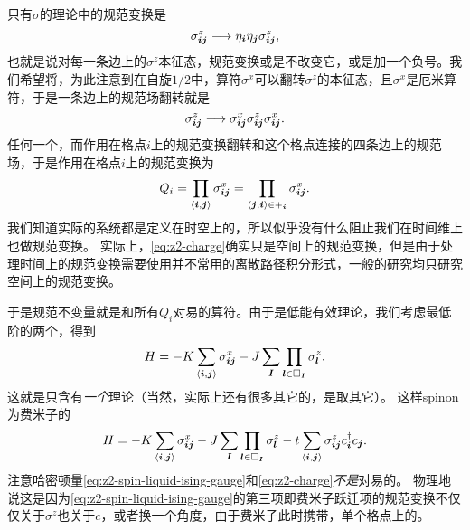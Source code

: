 只有$\sigma$的理论中的规范变换是
\begin{equation}
    {\sigma}_{\vb*{i} \vb*{j}}^z \longrightarrow \eta_{\vb*{i}} \eta_{\vb*{j}} {\sigma}_{\vb*{i} \vb*{j}}^z,
    \label{eq:pure-sigma-ztwo}
\end{equation}
也就是说对每一条边上的${\sigma}^z$本征态，规范变换或是不改变它，或是加一个负号。我们希望将，为此注意到在自旋$1/2$中，算符${\sigma}^x$可以翻转${\sigma}^z$的本征态，且${\sigma}^x$是厄米算符，于是一条边上的规范场翻转就是
\[
    {\sigma}_{\vb*{i} \vb*{j}}^z \longrightarrow {\sigma}^x_{\vb*{i} \vb*{j}} {\sigma}_{\vb*{i} \vb*{j}}^z {\sigma}^x_{\vb*{i} \vb*{j}}.
\]
任何一个，而作用在格点$i$上的规范变换翻转和这个格点连接的四条边上的规范场，于是作用在格点$i$上的规范变换为
\begin{equation}
    {Q}_i = \prod_{\langle \vb*{i}, \vb*{j} \rangle} {\sigma}^x_{\vb*{i} \vb*{j}} = \prod_{\langle \vb*{j}, \vb*{i} \rangle \in +_{\vb*{i}}} {\sigma}^x_{\vb*{i} \vb*{j}}.
    \label{eq:z2-charge}
\end{equation}
我们知道实际的系统都是定义在时空上的，所以似乎没有什么阻止我们在时间维上也做规范变换。
实际上，\eqref{eq:z2-charge}确实只是空间上的规范变换，但是由于处理时间上的规范变换需要使用并不常用的离散路径积分形式，一般的研究均只研究空间上的规范变换。

于是规范不变量就是和所有${Q}_i$对易的算符。由于是低能有效理论，我们考虑最低阶的两个，得到
\begin{equation}
    {H} = - K \sum_{\langle \vb*{i}, \vb*{j} \rangle} {\sigma}^x_{\vb*{i} \vb*{j}} - J \sum_{\vb*{I}} \prod_{\vb*{l} \in \Box_{\vb*{I}}} {\sigma}^z_{\vb*{l}}.
    \label{eq:z2-2d-hamiltonian}
\end{equation}
这就是只含有\emph{一个}理论（当然，实际上还有很多其它的，是取其它）。
这样spinon为费米子的
\begin{equation}
    {H} = - K \sum_{\langle \vb*{i}, \vb*{j} \rangle} {\sigma}^x_{\vb*{i} \vb*{j}} - J \sum_{\vb*{I}} \prod_{\vb*{l} \in \Box_{\vb*{I}}} {\sigma}^z_{\vb*{l}} - t \sum_{\langle \vb*{i}, \vb*{j} \rangle} \sigma^z_{\vb*{i} \vb*{j}} c^\dagger_{\vb*{i}} c_{\vb*{j}}.
    \label{eq:z2-spin-liquid-ising-gauge}
\end{equation}
注意哈密顿量\eqref{eq:z2-spin-liquid-ising-gauge}和\eqref{eq:z2-charge}\emph{不是}对易的。
物理地说这是因为\eqref{eq:z2-spin-liquid-ising-gauge}的第三项即费米子跃迁项的规范变换不仅仅关于$\sigma^z$也关于$c$，或者换一个角度，由于费米子此时携带，单个格点上的。

